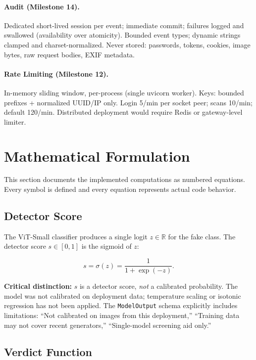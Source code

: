 \documentclass[10pt,conference,compsoc]{IEEEtran}
\begin{document}
\paragraph{Audit (Milestone 14).} Dedicated short-lived session per event; immediate commit; failures logged and swallowed (availability over atomicity). Bounded event types; dynamic strings clamped and charset-normalized. Never stored: passwords, tokens, cookies, image bytes, raw request bodies, EXIF metadata.

\paragraph{Rate Limiting (Milestone 12).} In-memory sliding window, per-process (single uvicorn worker). Keys: bounded prefixes + normalized UUID/IP only. Login 5/min per socket peer; scans 10/min; default 120/min. Distributed deployment would require Redis or gateway-level limiter.

\section{Mathematical Formulation}
\label{sec:math}

This section documents the implemented computations as numbered equations. Every symbol is defined and every equation represents actual code behavior.

\subsection{Detector Score}
\label{sec:math-detector}

The ViT-Small classifier produces a single logit $z \in \mathbb{R}$ for the fake class.
The detector score $s \in [0,1]$ is the sigmoid of $z$:

\begin{equation}
s = \sigma(z) = \frac{1}{1 + \exp(-z)}.
\label{eq:sigmoid}
\end{equation}

\textbf{Critical distinction:} $s$ is a detector score, \emph{not} a calibrated probability.
The model was not calibrated on deployment data; temperature scaling or isotonic regression has not been applied.
The \texttt{ModelOutput} schema explicitly includes limitations: ``Not calibrated on images from this deployment,'' ``Training data may not cover recent generators,'' ``Single-model screening aid only.''

\subsection{Verdict Function}
\label{sec:math-verdict}
\end{document}
